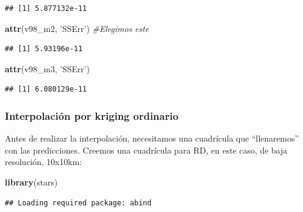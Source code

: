 \documentclass[11pt,]{article}
\newenvironment{Shaded}{\begin{snugshade}}{\end{snugshade}}
\newcommand{\KeywordTok}[1]{\textcolor[rgb]{0.13,0.29,0.53}{\textbf{#1}}}
\newcommand{\DataTypeTok}[1]{\textcolor[rgb]{0.13,0.29,0.53}{#1}}
\newcommand{\DecValTok}[1]{\textcolor[rgb]{0.00,0.00,0.81}{#1}}
\newcommand{\StringTok}[1]{\textcolor[rgb]{0.31,0.60,0.02}{#1}}
\newcommand{\CommentTok}[1]{\textcolor[rgb]{0.56,0.35,0.01}{\textit{#1}}}
\newcommand{\OperatorTok}[1]{\textcolor[rgb]{0.81,0.36,0.00}{\textbf{#1}}}
\newcommand{\NormalTok}[1]{#1}
\begin{document}
\begin{verbatim}
## [1] 5.877132e-11
\end{verbatim}

\begin{Shaded}
\begin{Highlighting}[]
\KeywordTok{attr}\NormalTok{(v98_m2, }\StringTok{'SSErr'}\NormalTok{) }\CommentTok{#Elegimos este}
\end{Highlighting}
\end{Shaded}

\begin{verbatim}
## [1] 5.93196e-11
\end{verbatim}

\begin{Shaded}
\begin{Highlighting}[]
\KeywordTok{attr}\NormalTok{(v98_m3, }\StringTok{'SSErr'}\NormalTok{)}
\end{Highlighting}
\end{Shaded}

\begin{verbatim}
## [1] 6.080129e-11
\end{verbatim}

\subsubsection{Interpolación por kriging
ordinario}\label{interpolaciuxf3n-por-kriging-ordinario}

Antes de realizar la interpolación, necesitamos una cuadrícula que
``llenaremos'' con las predicciones. Creemos una cuadrícula para RD, en
este caso, de baja resolución, 10x10km:

\begin{Shaded}
\begin{Highlighting}[]
\KeywordTok{library}\NormalTok{(stars)}
\end{Highlighting}
\end{Shaded}

\begin{verbatim}
## Loading required package: abind
\end{verbatim}

\begin{Shaded}
\end{Shaded}
\end{document}
